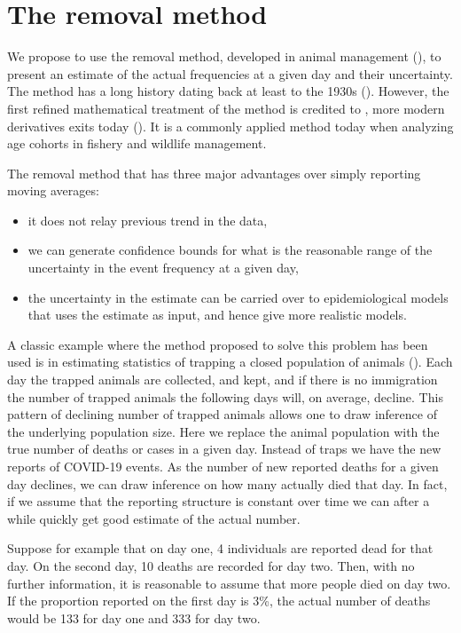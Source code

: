 \documentclass[a4paper,11pt,article,oneside,openany,american]{memoir}
\begin{document}
\chapter{The removal method}
We propose to use the removal method, developed in animal management (\cite{Pollock1991_review_papers}), to present an estimate of the actual frequencies at a given day and their uncertainty. The method has a long history dating back at least to the 1930s (\cite{Leslie1939_attempt_determine}). However, the first refined mathematical treatment of the method is credited to \cite{Moran1951_mathematical_theory}, more modern derivatives exits today (\cite{Matechou2016_open_models}). It is a commonly applied method today when analyzing age cohorts in fishery and wildlife management.

The removal method that has three major advantages over simply reporting moving averages:
\begin{itemize}
	\item it does not relay previous trend in the data,
	\item we can generate confidence bounds for what is the reasonable range of the uncertainty in the event frequency at a given day,
	\item the uncertainty in the estimate can be carried over to epidemiological models that uses the estimate as input, and hence give more realistic models.
\end{itemize}

A classic example where the method proposed to solve this problem has been used is in estimating statistics of trapping a closed population of animals (\cite{Pollock1991_review_papers}). Each day the trapped animals are collected, and kept, and if there is no immigration the number of trapped animals the following days will, on average, decline. This pattern of declining number of trapped animals allows one to draw inference of the underlying population size. Here we replace the animal population with the true number of deaths or cases in a given day. Instead of traps we have the new reports of COVID-19 events. As the number of new reported deaths for a given day declines, we can draw inference on how many actually died that day. In fact, if we assume that the reporting structure is constant over time we can after a while quickly get good estimate of the actual number.

Suppose for example that on day one, 4 individuals are reported dead for that day. On the second day, 10 deaths are recorded for day two. Then, with no further information, it is reasonable to assume that more people died on day two. If the proportion reported on the first day is 3\%, the actual number of deaths would be 133 for day one and 333 for day two.
\end{document}
